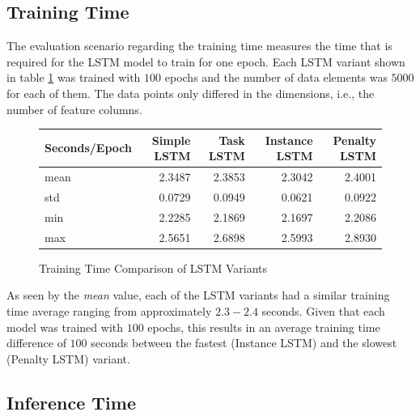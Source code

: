   \subsection{Training Time}
  \label{sec:training-time-evaluation-scenarios}

    The evaluation scenario regarding the training time measures the time that is required for the LSTM model to train for one epoch.
    Each LSTM variant shown in table \ref{tab:training-time-comparison-of-lstm-variants} was trained with $100$ epochs and the number of data elements was $5000$ for each of them. The data points only differed in the dimensions, i.e., the number of feature columns.


    \begin{figure}
      \centering

      \caption{Training Time Comparison of LSTM Variants}
      \label{tab:training-time-comparison-of-lstm-variants}

      \begin{tabular}{|l|rrrr|}
        \toprule
        {Seconds/Epoch} &  Simple LSTM &  Task LSTM &  Instance LSTM &  Penalty LSTM \\
        \midrule
        mean    &         2.3487 &      2.3853 &          2.3042 &             2.4001 \\
        std     &         0.0729 &      0.0949 &          0.0621 &             0.0922 \\
        min     &         2.2285 &      2.1869 &          2.1697 &             2.2086 \\
        max     &         2.5651 &      2.6898 &          2.5993 &             2.8930 \\
        \bottomrule
      \end{tabular}
    \end{figure}
    As seen by the \emph{mean} value, each of the LSTM variants had a similar training time average ranging from approximately $2.3-2.4$ seconds.
    Given that each model was trained with $100$ epochs, this results in an average training time difference of $100$ seconds between the fastest (Instance LSTM) and the slowest (Penalty LSTM) variant.

  \subsection{Inference Time}
  \label{sec:inference-time-evaluation-scenarios}

